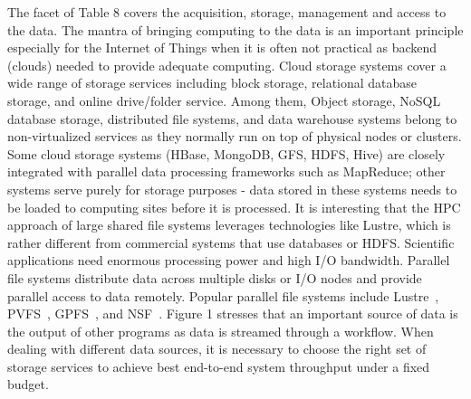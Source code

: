 \documentclass{acm_proc_article-sp}
\begin{document}
The facet of Table 8 covers the acquisition, storage, management and access to the data. The mantra of bringing computing to the data is an important principle especially for the Internet of Things when it is often not practical as backend (clouds) needed to provide adequate computing. Cloud storage systems cover a wide range of storage services including block storage, relational database storage, and online drive/folder service. Among them, Object storage, NoSQL database storage, distributed file systems, and data warehouse systems belong to non-virtualized services as they normally run on top of physical nodes or clusters. Some cloud storage systems (HBase, MongoDB, GFS, HDFS, Hive) are closely integrated with parallel data processing frameworks such as MapReduce; other systems serve purely for storage purposes - data stored in these systems needs to be loaded to computing sites before it is processed. It is interesting that the HPC approach of large shared file systems leverages technologies like Lustre, which is rather different from commercial systems that use databases or HDFS. Scientific applications need enormous processing power and high I/O bandwidth. Parallel file systems distribute data across multiple disks or I/O nodes and provide parallel access to data remotely. Popular parallel file systems include Lustre~\cite{Lustre1}, PVFS~\cite{ross2000pvfs}\cite{taki1999mpi}, GPFS~\cite{GPFS1}\cite{schmuck2002gpfs}\cite{GPFS3}, and NSF~\cite{sandberg1985design}\cite{NFS2}.  Figure 1 stresses that an important source of data is the output of other programs as data is streamed through a workflow. When dealing with different data sources, it is necessary to choose the right set of storage services to achieve best end-to-end system throughput under a fixed budget.
\end{document}
